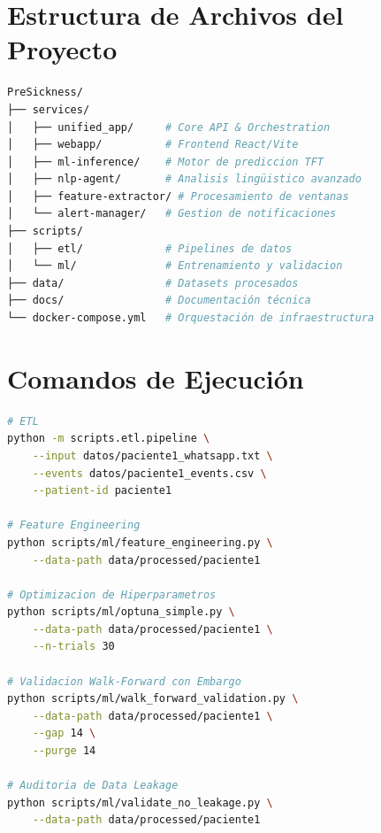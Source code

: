 \documentclass[11pt,a4paper]{article}
\begin{document}
\appendix

\section{Estructura de Archivos del Proyecto}

\begin{lstlisting}[language=bash, caption={Estructura actual de servicios}]
PreSickness/
├── services/
│   ├── unified_app/     # Core API & Orchestration
│   ├── webapp/          # Frontend React/Vite
│   ├── ml-inference/    # Motor de prediccion TFT
│   ├── nlp-agent/       # Analisis lingüistico avanzado
│   ├── feature-extractor/ # Procesamiento de ventanas
│   └── alert-manager/   # Gestion de notificaciones
├── scripts/
│   ├── etl/             # Pipelines de datos
│   └── ml/              # Entrenamiento y validacion
├── data/                # Datasets procesados
├── docs/                # Documentación técnica
└── docker-compose.yml   # Orquestación de infraestructura
\end{lstlisting}

\section{Comandos de Ejecución}

\begin{lstlisting}[language=bash, caption={Comandos principales}]
# ETL
python -m scripts.etl.pipeline \
    --input datos/paciente1_whatsapp.txt \
    --events datos/paciente1_events.csv \
    --patient-id paciente1

# Feature Engineering
python scripts/ml/feature_engineering.py \
    --data-path data/processed/paciente1

# Optimizacion de Hiperparametros
python scripts/ml/optuna_simple.py \
    --data-path data/processed/paciente1 \
    --n-trials 30

# Validacion Walk-Forward con Embargo
python scripts/ml/walk_forward_validation.py \
    --data-path data/processed/paciente1 \
    --gap 14 \
    --purge 14

# Auditoria de Data Leakage
python scripts/ml/validate_no_leakage.py \
    --data-path data/processed/paciente1
\end{lstlisting}

\end{document}
